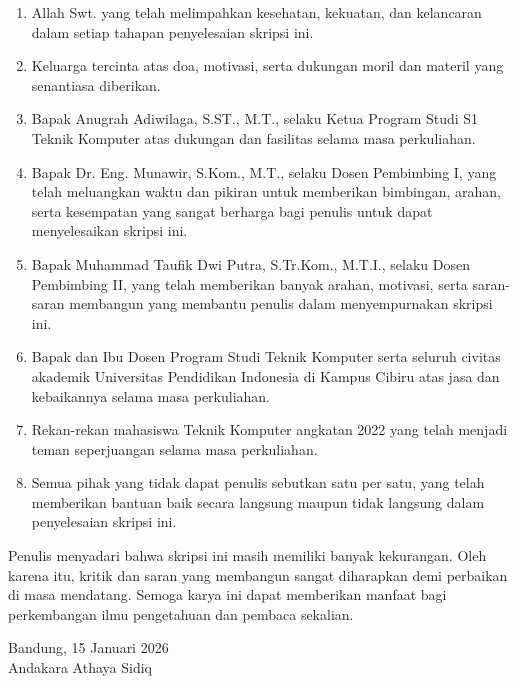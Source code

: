 \documentclass[12pt, a4paper, oneside]{report}
\newcommand{\authorname}{Andakara Athaya Sidiq}
\newcommand{\thesisyear}{2026}
\newcommand{\advisorone}{Dr. Eng. Munawir, S.Kom., M.T.}
\newcommand{\advisortwo}{Muhammad Taufik Dwi Putra, S.Tr.Kom., M.T.I.}
\begin{document}
\begin{enumerate}[label=\arabic*., leftmargin=*, nosep]
    \item Allah Swt. yang telah melimpahkan kesehatan, kekuatan, dan kelancaran dalam setiap tahapan penyelesaian skripsi ini.
    \item Keluarga tercinta atas doa, motivasi, serta dukungan moril dan materil yang senantiasa diberikan.
    \item Bapak Anugrah Adiwilaga, S.ST., M.T., selaku Ketua Program Studi S1 Teknik Komputer atas dukungan dan fasilitas selama masa perkuliahan.
    \item Bapak \advisorone, selaku Dosen Pembimbing I, yang telah meluangkan waktu dan pikiran untuk memberikan bimbingan, arahan, serta kesempatan yang sangat berharga bagi penulis untuk dapat menyelesaikan skripsi ini.
    \item Bapak \advisortwo, selaku Dosen Pembimbing II, yang telah memberikan banyak arahan, motivasi, serta saran-saran membangun yang membantu penulis dalam menyempurnakan skripsi ini.
    \item Bapak dan Ibu Dosen Program Studi Teknik Komputer serta seluruh civitas akademik Universitas Pendidikan Indonesia di Kampus Cibiru atas jasa dan kebaikannya selama masa perkuliahan.
    \item Rekan-rekan mahasiswa Teknik Komputer angkatan 2022 yang telah menjadi teman seperjuangan selama masa perkuliahan.
    \item Semua pihak yang tidak dapat penulis sebutkan satu per satu, yang telah memberikan bantuan baik secara langsung maupun tidak langsung dalam penyelesaian skripsi ini.
\end{enumerate}

Penulis menyadari bahwa skripsi ini masih memiliki banyak kekurangan. Oleh karena itu, kritik dan saran yang membangun sangat diharapkan demi perbaikan di masa mendatang. Semoga karya ini dapat memberikan manfaat bagi perkembangan ilmu pengetahuan dan pembaca sekalian.

\vspace{1cm}
\begin{flushright}
    Bandung, 15 Januari \thesisyear \\
    \vspace{1.5cm}
    \authorname
\end{flushright}
\end{document}
